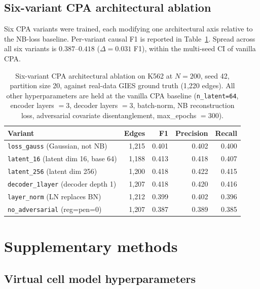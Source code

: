 \documentclass{article}
\begin{document}
\subsection{Six-variant CPA architectural ablation}
\label{app:cpa_ablation}

Six CPA variants were trained, each modifying one architectural axis relative to the NB-loss baseline. Per-variant causal F1 is reported in Table~\ref{tab:ablation_cpa}. Spread across all six variants is $0.387$--$0.418$ ($\Delta = 0.031$ F1), within the multi-seed CI of vanilla CPA.

\begin{table}[h]
\centering
\small
\begin{tabular}{lrrrr}
\toprule
\textbf{Variant} & \textbf{Edges} & \textbf{F1} & \textbf{Precision} & \textbf{Recall} \\
\midrule
\texttt{loss\_gauss}\,\,(Gaussian, not NB)        & 1{,}215 & 0.401 & 0.402 & 0.400 \\
\texttt{latent\_16}\,\,(latent dim 16, base 64)  & 1{,}188 & 0.413 & 0.418 & 0.407 \\
\texttt{latent\_256}\,\,(latent dim 256)         & 1{,}200 & 0.418 & 0.422 & 0.415 \\
\texttt{decoder\_1layer}\,\,(decoder depth 1)    & 1{,}207 & 0.418 & 0.420 & 0.416 \\
\texttt{layer\_norm}\,\,(LN replaces BN)         & 1{,}212 & 0.399 & 0.402 & 0.396 \\
\texttt{no\_adversarial}\,\,(reg=pen=0)          & 1{,}207 & 0.387 & 0.389 & 0.385 \\
\bottomrule
\end{tabular}
\caption{Six-variant CPA architectural ablation on K562 at $N{=}200$, seed 42, partition size 20, against real-data GIES ground truth (1{,}220 edges). All other hyperparameters are held at the vanilla CPA baseline (\texttt{n\_latent=64}, encoder layers $=3$, decoder layers $=3$, batch-norm, NB reconstruction loss, adversarial covariate disentanglement, max\_epochs $=300$).}
\label{tab:ablation_cpa}
\end{table}

\section{Supplementary methods}
\label{app:supp_methods}

\subsection{Virtual cell model hyperparameters}
\label{app:hparams}
\end{document}

